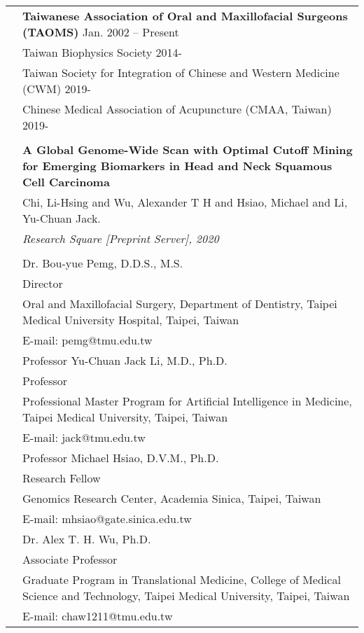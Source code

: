 \documentclass[letterpaper, 11pt]{article}
\begin{document}
\begin{longtable}{p{1.3in}p{4.8in}}

\nohyphens{\color{OliveGreen}{Professional memberships}}
& {\textbf{Taiwanese Association of Oral and Maxillofacial Surgeons (TAOMS)}} \hfill Jan. 2002 -- Present \\
& Taiwan Biophysics Society \hfill 2014-\\ 
& Taiwan Society for Integration of Chinese and Western Medicine (CWM) \hfill 2019-\\
& Chinese Medical Association of Acupuncture (CMAA, Taiwan) \hfill 2019- \\
& \\


\nohyphens{\color{OliveGreen}{Manuscript under review}}
& \textbf{A Global Genome-Wide Scan with Optimal Cutoff Mining for Emerging Biomarkers in Head and Neck Squamous Cell Carcinoma} \\
& Chi, Li-Hsing and Wu, Alexander T H and Hsiao, Michael and Li, Yu-Chuan Jack.\\
& \textit{Research Square [Preprint Server], 2020}\\
& \\

\pagebreak

\nohyphens{\color{OliveGreen}{References}} 
& Dr. Bou-yue Pemg, D.D.S., M.S.\\
& Director\\
& Oral and Maxillofacial Surgery, Department of Dentistry,
Taipei Medical University Hospital,
Taipei, Taiwan\\
& E-mail: pemg@tmu.edu.tw\\[0.5cm]


& Professor Yu-Chuan Jack Li, M.D.,  Ph.D.\\
& Professor\\
& Professional Master Program for Artificial Intelligence in Medicine, Taipei Medical University,
Taipei, Taiwan\\
& E-mail: jack@tmu.edu.tw\\[0.5cm]


& Professor Michael Hsiao, D.V.M., Ph.D.\\
& Research Fellow\\
& Genomics Research Center, 
Academia Sinica, Taipei, Taiwan\\
& E-mail: mhsiao@gate.sinica.edu.tw\\[0.5cm]

& Dr. Alex T. H. Wu, Ph.D.\\
& Associate Professor\\
& Graduate Program in Translational Medicine,
College of Medical Science and Technology,
Taipei Medical University,
Taipei, Taiwan\\
& E-mail: chaw1211@tmu.edu.tw\\




\end{longtable}
\end{document}
